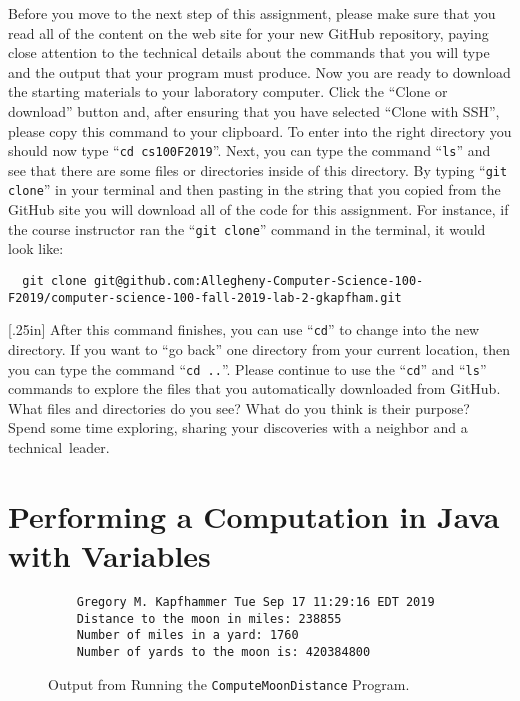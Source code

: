 \documentclass[11pt]{article}
\newcommand{\command}[1]{``\lstinline{#1}''}
\newcommand{\step}[1]{``{#1}''}
\newcommand{\discuss}[1]{\null\hfill\LARGE{\faCommentO{}}\newline\scriptsize{\em{#1}}}
\begin{document}
Before you move to the next step of this assignment, please make sure that you
read all of the content on the web site for your new GitHub repository, paying
close attention to the technical details about the commands that you will type
and the output that your program must produce. Now you are ready to download the
starting materials to your laboratory computer. Click the ``Clone or download''
button and, after ensuring that you have selected ``Clone with SSH'', please
copy this command to your clipboard. To enter into the right directory you
should now type \command{cd cs100F2019}. Next, you can type the command
\command{ls} and see that there are some files or directories inside of this
directory. By typing \command{git clone} in your terminal and then pasting in
the string that you copied from the GitHub site you will download all of the
code for this assignment. For instance, if the course instructor ran the
\command{git clone} command in the terminal, it would look like:

\begin{lstlisting}
  git clone git@github.com:Allegheny-Computer-Science-100-F2019/computer-science-100-fall-2019-lab-2-gkapfham.git
\end{lstlisting}

\marginnote{\discuss{Understand project layout}}[.25in] After this command
finishes, you can use \command{cd} to change into the new directory. If you want
to \step{go back} one directory from your current location, then you can type
the command \command{cd ..}. Please continue to use the \command{cd} and
\command{ls} commands to explore the files that you automatically downloaded
from GitHub. What files and directories do you see? What do you think is their
purpose? Spend some time exploring, sharing your discoveries with a neighbor and
a \mbox{technical leader}.

\section*{Performing a Computation in Java with Variables}

\begin{figure}[tb]
  \begin{verbatim}
    Gregory M. Kapfhammer Tue Sep 17 11:29:16 EDT 2019
    Distance to the moon in miles: 238855
    Number of miles in a yard: 1760
    Number of yards to the moon is: 420384800
  \end{verbatim}
\vspace*{-.25in}
\caption{Output from Running the {\tt ComputeMoonDistance} Program.}
\label{fig:output}
\end{figure}
\end{document}
